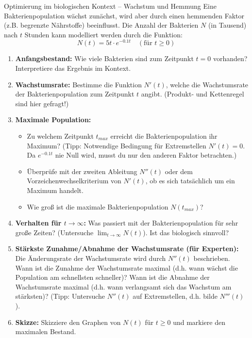 \begin{aufgabenumgebung}{Optimierung im biologischen Kontext – Wachstum und Hemmung}
Eine Bakterienpopulation wächst zunächst, wird aber durch einen hemmenden Faktor (z.B. begrenzte Nährstoffe) beeinflusst. Die Anzahl der Bakterien $N$ (in Tausend) nach $t$ Stunden kann modelliert werden durch die Funktion:
\[ N(t) = 5t \cdot e^{-0.1t} \quad (\text{für } t \ge 0) \]
\begin{enumerate}
    \item \textbf{Anfangsbestand:} Wie viele Bakterien sind zum Zeitpunkt $t=0$ vorhanden? Interpretiere das Ergebnis im Kontext.
    \item \textbf{Wachstumsrate:} Bestimme die Funktion $N'(t)$, welche die Wachstumsrate der Bakterienpopulation zum Zeitpunkt $t$ angibt. (Produkt- und Kettenregel sind hier gefragt!)
    \item \textbf{Maximale Population:}
        \begin{itemize}
            \item Zu welchem Zeitpunkt $t_{max}$ erreicht die Bakterienpopulation ihr Maximum? (Tipp: Notwendige Bedingung für Extremstellen $N'(t)=0$. Da $e^{-0.1t}$ nie Null wird, musst du nur den anderen Faktor betrachten.)
            \item Überprüfe mit der zweiten Ableitung $N''(t)$ oder dem Vorzeichenwechselkriterium von $N'(t)$, ob es sich tatsächlich um ein Maximum handelt.
            \item Wie groß ist die maximale Bakterienpopulation $N(t_{max})$?
        \end{itemize}
    \item \textbf{Verhalten für $t \to \infty$:} Was passiert mit der Bakterienpopulation für sehr große Zeiten? (Untersuche $\lim_{t \to \infty} N(t)$). Ist das biologisch sinnvoll?
    \item \textbf{Stärkste Zunahme/Abnahme der Wachstumsrate (für Experten):}
        Die Änderungsrate der Wachstumsrate wird durch $N''(t)$ beschrieben. Wann ist die Zunahme der Wachstumsrate maximal (d.h. wann wächst die Population am schnellsten schneller)? Wann ist die Abnahme der Wachstumsrate maximal (d.h. wann verlangsamt sich das Wachstum am stärksten)? (Tipp: Untersuche $N''(t)$ auf Extremstellen, d.h. bilde $N'''(t)$).
    \item \textbf{Skizze:} Skizziere den Graphen von $N(t)$ für $t \ge 0$ und markiere den maximalen Bestand.
\end{enumerate}
\end{aufgabenumgebung}




